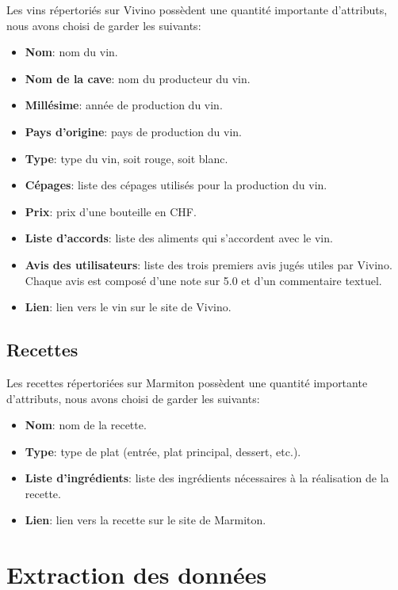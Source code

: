 Les vins répertoriés sur Vivino possèdent une quantité importante d'attributs, nous avons choisi de garder les suivants:
\begin{itemize}
    \item \textbf{Nom}: nom du vin.
    \item \textbf{Nom de la cave}: nom du producteur du vin.
    \item \textbf{Millésime}: année de production du vin.
    \item \textbf{Pays d'origine}: pays de production du vin.
    \item \textbf{Type}: type du vin, soit rouge, soit blanc.
    \item \textbf{Cépages}: liste des cépages utilisés pour la production du vin.
    \item \textbf{Prix}: prix d'une bouteille en CHF.
    \item \textbf{Liste d'accords}: liste des aliments qui s'accordent avec le vin.
    \item \textbf{Avis des utilisateurs}: liste des trois premiers avis jugés utiles par Vivino. Chaque avis est composé d'une note sur 5.0 et d'un commentaire textuel.
    \item \textbf{Lien}: lien vers le vin sur le site de Vivino.
\end{itemize}

\subsection{Recettes}

Les recettes répertoriées sur Marmiton possèdent une quantité importante d'attributs, nous avons choisi de garder les suivants:
\begin{itemize}
    \item \textbf{Nom}: nom de la recette.
    \item \textbf{Type}: type de plat (entrée, plat principal, dessert, etc.).
    \item \textbf{Liste d'ingrédients}: liste des ingrédients nécessaires à la réalisation de la recette.
    \item \textbf{Lien}: lien vers la recette sur le site de Marmiton.
\end{itemize}

\section{Extraction des données}

